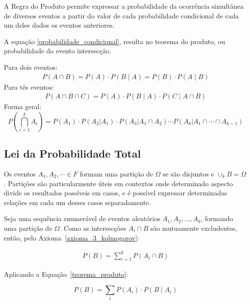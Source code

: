 A Regra do Produto permite expressar a probabilidade da ocorrência simultânea de diversos eventos a partir do valor de cada probabilidade condicional de cada um deles dados os eventos anteriores.

A equação \ref{probabilidade_condicional}, resulta no teorema do produto, ou probabilidade do evento intersecção.


\begin{teorema}
	Para dois eventos:
	\begin{align*}
		P(A \cap B) = P(A) \cdot P(B\mid A) = P(B) \cdot P(A\mid B)
	\end{align*}
	Para tês eventos:
	\begin{align*}
	P(A \cap B \cap C) = P(A) \cdot P(B\mid A) \cdot P(C \mid A\cap B)
	\end{align*}
	Forma geral:
	\begin{equation}\label{teorema_produto}
	P\left(\bigcap_{i=1}^{k} A_i\right) = P(A_1) \cdot P(A_2 | A_1) \cdot P(A_3 | A_1 \cap A_2) \cdots P(A_k | A_1 \cap \cdots \cap A_{k-1})
	\end{equation}
\end{teorema}



\subsection{Lei da Probabilidade Total}


Os eventos $A_1, A_2, \cdots \in F$ formam uma partição de $\Omega$ se são disjuntos e $\cup_k B = \Omega$. Partições são particularmente úteis em contextos onde determinado aspecto divide os resultados possíveis em casos, e é possível expressar determinadas relações em cada um desses casos separadamente.\cite{Leonardo2026}


\begin{teorema}
	Seja uma sequência enumerável de eventos aleatórios $A_1,A_2, \dots ,A_k$, formando uma partição de $\Omega$. Como as intersecções $A_i \cap B$ são mutuamente excludentes, então, pelo Axioma~\ref{axioma_3_kolmogorov}:
	
	\begin{align*}
		P(B) = \sum_{i=1}^{k} P(A_i \cap B)
	\end{align*}
	
	Aplicando a Equação~\ref{teorema_produto}:
	
	\begin{equation}\label{teorema_probabilidade_total}
		P(B) = \sum_{i} P(A_i) \cdot P(B \mid A_i)
	\end{equation}
	
\end{teorema}

